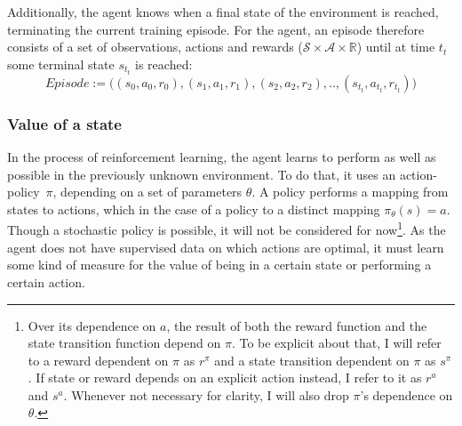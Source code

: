 Additionally, the agent knows when a final state of the environment is reached, terminating the current training episode. For the agent, an episode therefore consists of a set of observations, actions and rewards ($\mathcal{S} \times \mathcal{A} \times \mathds{R}$) until at time $t_t$ some terminal state $s_{t_t}$ is reached: $$Episode := \big((s_0, a_0, r_0), (s_1, a_1, r_1), (s_2,a_2,r_2), .., (s_{t_t}, a_{t_t}, r_{t_t})\big)$$

\subsubsection{Value of a state}

In the process of reinforcement learning, the agent learns to perform as well as possible in the previously unknown environment. To do that, it uses an \mbox{action-policy $\pi$,} depending on a set of parameters $\theta$. A policy performs a mapping from states to actions, which in the case of a  policy to a distinct mapping $\pi_\theta(s) = a$. Though a stochastic policy is possible, it will not be considered for now\footnote{Over its dependence on $a$, the result of both the reward function and the state transition function depend on $\pi$. To be explicit about that, I will refer to a reward dependent on $\pi$ as $r^\pi$ and a state transition dependent on $\pi$ as $s^\pi$. If state or reward depends on an explicit action instead, I refer to it as $r^a$ and $s^a$. Whenever not necessary for clarity, I will also drop $\pi$'s dependence on $\theta$.}. %
As the agent does not have supervised data on which actions are optimal, it must learn some kind of measure for the value of being in a certain state or performing a certain action.

